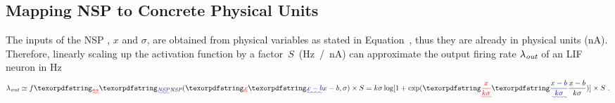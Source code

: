 	\subsection{Mapping NSP to Concrete Physical Units}
	\label{sec:af_model}
	The inputs of the NSP \DIFaddbegin {}\DIFaddend , $x$ and $\sigma$, are obtained from physical variables as stated in Equation~\DIFdelbegin \DIFdel{\ref{equ:distr}}\DIFdelend \DIFaddbegin {}\DIFaddend , thus they are already in physical units (nA).
	Therefore, linearly scaling up the activation function by a factor~$S$~(Hz~/~nA) can approximate the output firing rate $\lambda_{\textit{\textrm{out}}}$ of an LIF neuron in Hz\DIFdelbegin \DIFdel{:
	}\DIFdelend \DIFaddbegin {}\DIFaddend \begin{equation}
	\lambda_{\textit{\textrm{out}}} \simeq f\DIFdelbegin \DIFdel{_{ns}}\DIFdelend \DIFaddbegin \DIFadd{_{\textit{\textrm{NSP}}}}\DIFaddend (\DIFdelbegin \DIFdel{x}\DIFdelend \DIFaddbegin \DIFadd{x-b}\DIFaddend , \sigma) \times S = k \sigma \log [1 + \exp(\DIFdelbegin \DIFdel{\frac{x}{k \sigma}}\DIFdelend \DIFaddbegin \DIFadd{\frac{x-b}{k \sigma}}\DIFaddend )] \times S~.
	\label{equ:fit}
	\end{equation}	

